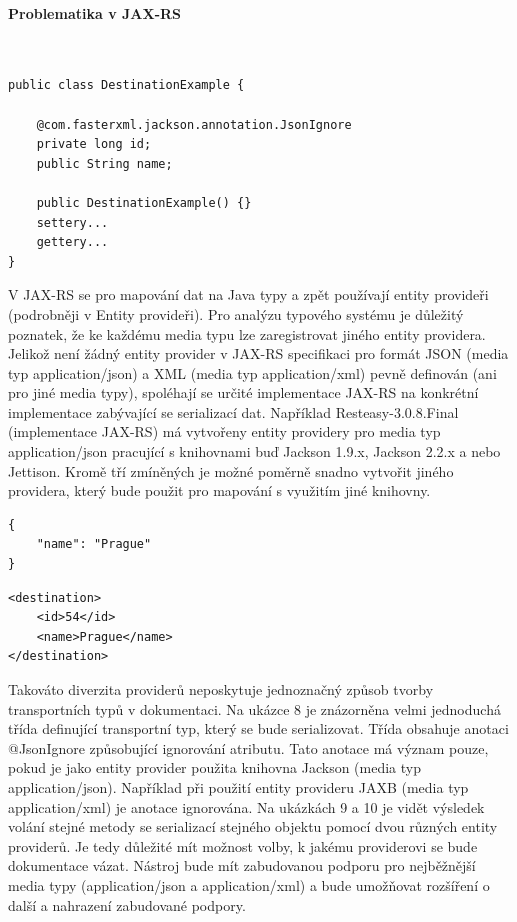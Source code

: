 \documentclass[11pt,twoside,a4paper]{book}
\begin{document}
\begin{itemize}
\paragraph{Problematika v JAX-RS}
\mbox{}\\

\begin{lstlisting}[frame=single]
public class DestinationExample {

    @com.fasterxml.jackson.annotation.JsonIgnore
    private long id;
    public String name;

    public DestinationExample() {}
    settery...
    gettery...
}
\end{lstlisting}

V JAX-RS se pro mapování dat na Java typy a zpět používají entity provideři (podrobněji v
Entity provideři). Pro analýzu typového systému je důležitý poznatek, že ke každému media
typu lze zaregistrovat jiného entity providera. Jelikož není žádný entity provider v JAX-RS
specifikaci pro formát JSON (media typ application/json) a XML (media typ
application/xml) pevně definován (ani pro jiné media typy), spoléhají se určité
implementace JAX-RS na konkrétní implementace zabývající se serializací dat. Například
Resteasy-3.0.8.Final (implementace JAX-RS) má vytvořeny entity providery pro media typ
application/json pracující s knihovnami buď Jackson 1.9.x, Jackson 2.2.x a nebo
Jettison. Kromě tří zmíněných je možné poměrně snadno vytvořit jiného providera, který
bude použit pro mapování s využitím jiné knihovny. 

\begin{lstlisting}[frame=single]
{
    "name": "Prague"
}
\end{lstlisting}

\begin{lstlisting}[frame=single]
<destination>
    <id>54</id>
    <name>Prague</name>
</destination>
\end{lstlisting}

Takováto diverzita providerů neposkytuje
jednoznačný způsob tvorby transportních typů v dokumentaci. Na ukázce 8 je znázorněna
velmi jednoduchá třída definující transportní typ, který se bude serializovat. Třída obsahuje
anotaci @JsonIgnore způsobující ignorování atributu. Tato anotace má význam pouze,
pokud je jako entity provider použita knihovna Jackson (media typ application/json).
Například při použití entity provideru JAXB (media typ application/xml) je anotace
ignorována. Na ukázkách 9 a 10 je vidět výsledek volání stejné metody se serializací stejného
objektu pomocí dvou různých entity providerů. Je tedy důležité mít možnost volby, k jakému
providerovi se bude dokumentace vázat. Nástroj bude mít zabudovanou podporu pro
nejběžnější media typy (application/json a application/xml) a bude umožňovat
rozšíření o další a nahrazení zabudované podpory.


\end{itemize}
\end{document}
